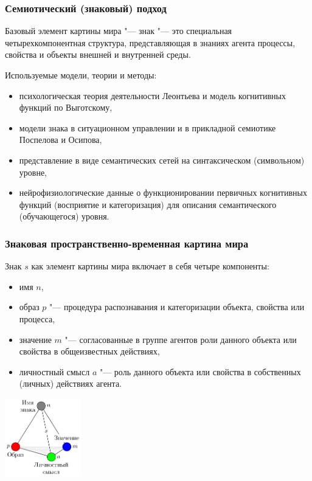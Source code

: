 \documentclass[default]{beamer}
\begin{document}
	\begin{frame}
		\frametitle{Семиотический (знаковый) подход}
		
		Базовый элемент картины мира "--- знак "--- это специальная четырехкомпонентная структура, представляющая в знаниях агента процессы, свойства и объекты внешней и внутренней среды.
		
		Используемые модели, теории и методы:
		\begin{itemize}
			\item психологическая теория деятельности Леонтьева и модель когнитивных функций по Выготскому,
			\item модели знака в ситуационном управлении и в прикладной семиотике Поспелова и Осипова,
			\item представление в виде семантических сетей на синтаксическом (символьном) уровне,
			\item нейрофизиологические данные о функционировании первичных когнитивных функций (восприятие и категоризация) для описания семантического (обучающегося) уровня.
		\end{itemize}
	\end{frame}


	\begin{frame}
		\frametitle{Знаковая пространственно-временная картина мира}

		Знак $s$ как элемент картины мира включает в себя четыре компоненты:
		\begin{itemize}
			\item имя $n$,
			\item образ $p$ "--- процедура распознавания и категоризации объекта, свойства или процесса,
			\item значение $m$ "--- согласованные в группе агентов роли данного объекта или свойства в общеизвестных действиях,
			\item личностный смысл $a$  "--- роль данного объекта или свойства в собственных (личных) действиях агента.
		\end{itemize}
		\begin{center}
			\includegraphics[width=0.25\textwidth]{signs/sign_colored}
		\end{center}
	\end{frame}
\end{document}
